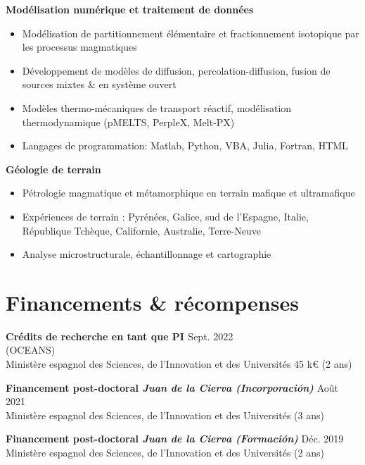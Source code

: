 \documentclass[a4paper,11pt]{article}
\begin{document}
    \textbf{Modélisation numérique et traitement de données}
    \begin{itemize}[itemsep=0pt,parsep=2pt]
        \item Modélisation de partitionnement élémentaire et fractionnement isotopique par les processus magmatiques
        \item Développement de modèles de diffusion, percolation-diffusion, fusion de sources mixtes \& en système ouvert
        \item Modèles thermo-mécaniques de transport réactif, modélisation thermodynamique (pMELTS, PerpleX, Melt-PX)
        \item Langages de programmation: Matlab, Python, VBA, Julia, Fortran, HTML
    \end{itemize}
    
    \textbf{Géologie de terrain}
    \begin{itemize}[itemsep=0pt,parsep=2pt]
        \item Pétrologie magmatique et métamorphique en terrain mafique et ultramafique
        \item Expériences de terrain : Pyrénées, Galice, sud de l'Espagne, Italie, République Tchèque, Californie, Australie, Terre-Neuve
        \item Analyse microstructurale, échantillonnage et cartographie
    \end{itemize}

\section{Financements \& récompenses}

    \textbf{Crédits de recherche en tant que PI \textit{}}
    \hfill {Sept. 2022}\\
     (OCEANS)\\
    Ministère espagnol des Sciences, de l'Innovation et des Universités 45 k€ (2 ans)
    
    \textbf{Financement post-doctoral \textit{Juan de la Cierva (Incorporación)}}
    \hfill {Août 2021}\\
    Ministère espagnol des Sciences, de l'Innovation et des Universités (3 ans)
    
    \textbf{Financement post-doctoral \textit{Juan de la Cierva (Formación)}}
    \hfill {Déc. 2019}\\
    Ministère espagnol des Sciences, de l'Innovation et des Universités (2 ans)
    
\end{document}
